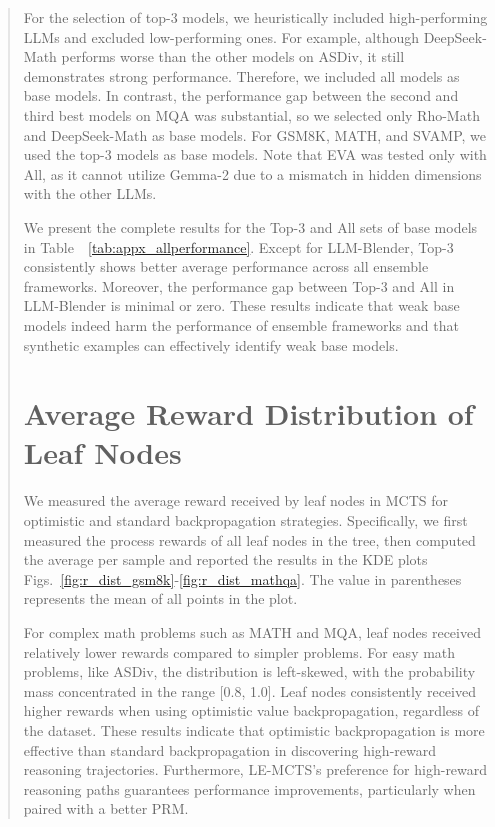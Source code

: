 \documentclass[11pt]{article}
\begin{document}
\begin{abstract}
For the selection of top-3 models, we heuristically included high-performing LLMs and excluded low-performing ones. 
For example, although DeepSeek-Math performs worse than the other models on ASDiv, it still demonstrates strong performance. 
Therefore, we included all models as base models.
In contrast, the performance gap between the second and third best models on MQA was substantial, so we selected only Rho-Math and DeepSeek-Math as base models.
For GSM8K, MATH, and SVAMP, we used the top-3 models as base models.
Note that EVA was tested only with All, as it cannot utilize Gemma-2 due to a mismatch in hidden dimensions with the other LLMs.

We present the complete results for the Top-3 and All sets of base models in Table~~\ref{tab:appx_allperformance}. 
Except for LLM-Blender, Top-3 consistently shows better average performance across all ensemble frameworks. 
Moreover, the performance gap between Top-3 and All in LLM-Blender is minimal or zero. 
These results indicate that weak base models indeed harm the performance of ensemble frameworks and that synthetic examples can effectively identify weak base models.




\section{Average Reward Distribution of Leaf Nodes}
\label{text:appx:r_dist}
We measured the average reward received by leaf nodes in MCTS for optimistic and standard backpropagation strategies. 
Specifically, we first measured the process rewards of all leaf nodes in the tree, then computed the average per sample and reported the results in the KDE plots Figs.~\ref{fig:r_dist_gsm8k}-\ref{fig:r_dist_mathqa}.
The value in parentheses represents the mean of all points in the plot. 

For complex math problems such as MATH and MQA, leaf nodes received relatively lower rewards compared to simpler problems. 
For easy math problems, like ASDiv, the distribution is left-skewed, with the probability mass concentrated in the range [0.8, 1.0].
Leaf nodes consistently received higher rewards when using optimistic value backpropagation, regardless of the dataset.
These results indicate that optimistic backpropagation is more effective than standard backpropagation in discovering high-reward reasoning trajectories. 
Furthermore, LE-MCTS's preference for high-reward reasoning paths guarantees performance improvements, particularly when paired with a better PRM.


\end{abstract}
\end{document}
